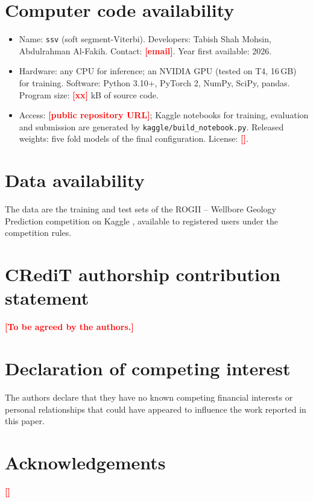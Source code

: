 \documentclass[preprint,12pt,authoryear]{elsarticle}
\newcommand{\PH}[1]{\textcolor{red}{\textbf{[#1]}}}
\begin{document}
\section*{Computer code availability}\label{sec:code}
\begin{itemize}
\item Name: \texttt{ssv} (soft segment-Viterbi). Developers: Tabish Shah Mohsin, Abdulrahman Al-Fakih. Contact: \PH{email}. Year first available: 2026.
\item Hardware: any CPU for inference; an NVIDIA GPU (tested on T4, 16\,GB) for training. Software: Python 3.10+, PyTorch 2, NumPy, SciPy, pandas. Program size: \PH{xx} kB of source code.
\item Access: \PH{public repository URL}; Kaggle notebooks for training, evaluation and submission are generated by \texttt{kaggle/build\_notebook.py}. Released weights: five fold models of the final configuration. License: \PH{}.
\end{itemize}

\section*{Data availability}
The data are the training and test sets of the ROGII -- Wellbore Geology Prediction competition on Kaggle \citep{rogii2026}, available to registered users under the competition rules.

\section*{CRediT authorship contribution statement}
\PH{To be agreed by the authors.}

\section*{Declaration of competing interest}
The authors declare that they have no known competing financial interests or personal relationships that could have appeared to influence the work reported in this paper.

\section*{Acknowledgements}
\PH{}



\end{document}
